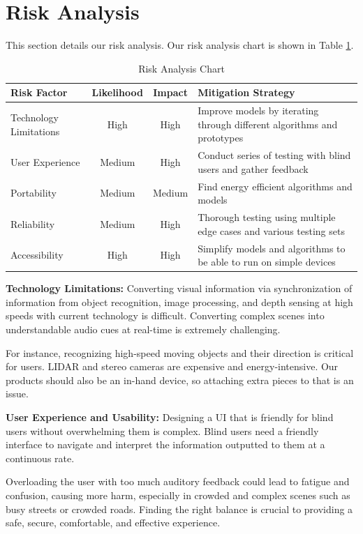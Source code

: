 \documentclass[12pt,a4paper]{article}
\begin{document}
\newpage
\section{Risk Analysis}
This section details our risk analysis. Our risk analysis chart is shown in Table \ref{tab:risk-assessment}.

\begin{table}[htbp]
    \centering
    \caption{Risk Analysis Chart}
    \label{tab:risk-assessment}
    \begin{tabular}{|p{3cm}|c|c|p{6cm}|}
    \hline
    \textbf{Risk Factor} & \textbf{Likelihood} & \textbf{Impact} & \textbf{Mitigation Strategy} \\
    \hline
    Technology Limitations & High & High & Improve models by iterating through different algorithms and prototypes \\
    \hline
    User Experience & Medium & High & Conduct series of testing with blind users and gather feedback \\
    \hline
    Portability & Medium & Medium & Find energy efficient algorithms and models \\
    \hline
    Reliability & Medium & High & Thorough testing using multiple edge cases and various testing sets \\
    \hline
    Accessibility & High & High & Simplify models and algorithms to be able to run on simple devices \\
    \hline
    \end{tabular}
    \end{table}

\textbf{Technology Limitations:}
Converting visual information via synchronization of information from object recognition, image processing, and depth sensing at high speeds with current technology is difficult. Converting complex scenes into understandable audio cues at real-time is extremely challenging. 

For instance, recognizing high-speed moving objects and their direction is critical for users. LIDAR and stereo cameras are expensive and energy-intensive. Our products should also be an in-hand device, so attaching extra pieces to that is an issue.

\textbf{User Experience and Usability:}
Designing a UI that is friendly for blind users without overwhelming them is complex. Blind users need a friendly interface to navigate and interpret the information outputted to them at a continuous rate. 

Overloading the user with too much auditory feedback could lead to fatigue and confusion, causing more harm, especially in crowded and complex scenes such as busy streets or crowded roads. Finding the right balance is crucial to providing a safe, secure, comfortable, and effective experience.
\end{document}
